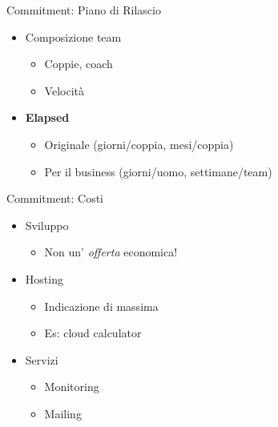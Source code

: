 \documentclass[compress, red, 14pt, pdf]{beamer}
\newcommand{\highlight}[1]{{\color{purple} \emph{#1}}}
\begin{document}
	\begin{frame}{Commitment: Piano di Rilascio}
		
		\begin{itemize}
			\item Composizione team
			\begin{itemize}
				\item Coppie, coach
				\item Velocità
			\end{itemize}
		\end{itemize}

		\begin{itemize}
			\item \textbf{Elapsed}
			\begin{itemize}
				\item Originale (giorni/coppia, mesi/coppia)
				\item Per il business (giorni/uomo, settimane/team)
			\end{itemize}
		\end{itemize}

	\end{frame}
	
	\begin{frame}{Commitment: Costi}
		\begin{itemize}
			\item Sviluppo
				\begin{itemize}
					\item Non un'\highlight{offerta} economica!
				\end{itemize}
			\item Hosting
				\begin{itemize}
					\item Indicazione di massima
					\item Es: cloud calculator
				\end{itemize}
			\item Servizi
			\begin{itemize}
				\item Monitoring
				\item Mailing
			\end{itemize}
		\end{itemize}

	\end{frame}
	
\end{document}
